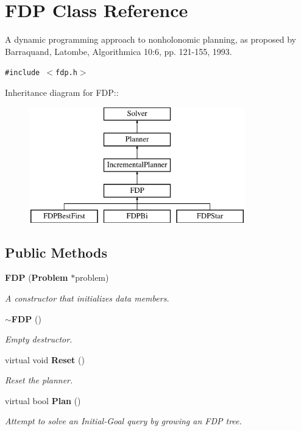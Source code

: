\section{FDP  Class Reference}
\label{class_FDP}
A dynamic programming approach to nonholonomic planning, as proposed by Barraquand, Latombe, Algorithmica 10:6, pp. 121-155, 1993. 


{\tt \#include $<$fdp.h$>$}

Inheritance diagram for FDP::\begin{figure}[H]
\begin{center}
\leavevmode
\includegraphics[height=5cm]{class_FDP}
\end{center}
\end{figure}
\subsection*{Public Methods}
\begin{CompactItemize}
\item 
{\bf FDP} ({\bf Problem} $\ast$problem)
\begin{CompactList}\small\item\em A constructor that initializes data members.\item\end{CompactList}\item 
{\bf $\sim$FDP} ()
\begin{CompactList}\small\item\em Empty destructor.\item\end{CompactList}\item 
virtual void {\bf Reset} ()
\begin{CompactList}\small\item\em Reset the planner.\item\end{CompactList}\item 
virtual bool {\bf Plan} ()
\begin{CompactList}\small\item\em Attempt to solve an Initial-Goal query by growing an FDP tree.\item\end{CompactList}\end{CompactItemize}
